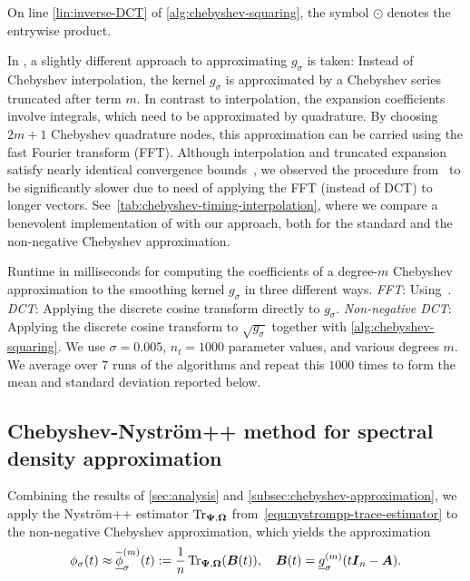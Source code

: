 On line \ref{lin:inverse-DCT} of \cref{alg:chebyshev-squaring}, the symbol $\odot$ denotes the entrywise product. 

In \cite{lin-2017-randomized-estimation}, a slightly different approach to approximating $g_{\sigma}$ is taken: Instead of Chebyshev interpolation,
the kernel $g_{\sigma}$ is approximated by a Chebyshev series~\cite[Chapter 4]{trefethen-2020-approximation-theory} truncated after term $m$. In contrast to interpolation, the expansion coefficients involve integrals, which need to be approximated by quadrature. By choosing $2m+1$ Chebyshev quadrature nodes, this approximation can be carried using the fast Fourier transform (FFT). Although interpolation and truncated expansion satisfy nearly identical convergence bounds~\cite[Theorem 8.2]{trefethen-2020-approximation-theory}, we observed the procedure from~\cite{lin-2017-randomized-estimation} to be significantly slower due to need of applying the FFT (instead of DCT) to longer vectors. See~\cref{tab:chebyshev-timing-interpolation}, where we compare a benevolent implementation of \cite[Algorithm 1]{lin-2017-randomized-estimation} with our approach, both for the standard and the non-negative Chebyshev approximation.%

\begin{table}[ht]
    \caption{Runtime in milliseconds for computing the coefficients of a degree-$m$ Chebyshev approximation to the smoothing kernel $g_{\sigma}$ in three different ways. \emph{FFT}: Using~\cite[Algorithm 1]{lin-2017-randomized-estimation}.  \emph{DCT}: Applying the discrete cosine transform directly to $g_\sigma$.  \emph{Non-negative DCT}: Applying the discrete cosine transform to $\sqrt{g_\sigma}$ together with \cref{alg:chebyshev-squaring}. We use $\sigma=0.005$, $n_t=1000$ parameter values, and various degrees $m$. We average over 7 runs of the algorithms and repeat this $1000$ times to form the mean and standard deviation reported below.}
    \label{tab:chebyshev-timing-interpolation}
   
\end{table}

\subsection{Chebyshev-Nyström++ method for spectral density approximation}
\label{subsec:chebyshev-nystrom}

Combining the results of \cref{sec:analysis} and \cref{subsec:chebyshev-approximation}, we apply the Nyström++ estimator $\operatorname{Tr}_{\boldsymbol{\Psi}, \boldsymbol{\Omega}}$ from~\cref{equ:nystrompp-trace-estimator}
to the non-negative 
Chebyshev approximation, which yields the approximation
\begin{equation}
    \phi_{\sigma}(t) \approx \widetilde{\underline{\phi}}_{\sigma}^{(m)}(t) := \frac{1}{n} \operatorname{Tr}_{\boldsymbol{\Psi}, \boldsymbol{\Omega}}(\boldsymbol{B}(t)), \quad \boldsymbol{B}(t) = \underline{g}_{\sigma}^{(m)}(t \boldsymbol{I}_n - \boldsymbol{A}).
    \label{equ:chebyshev-nystrom-formula}
\end{equation}

